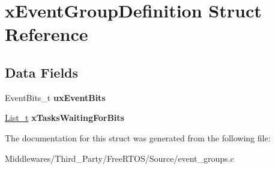 \hypertarget{structx_event_group_definition}{}\section{x\+Event\+Group\+Definition Struct Reference}
\label{structx_event_group_definition}
\subsection*{Data Fields}
\begin{DoxyCompactItemize}
\item 
\mbox{\label{structx_event_group_definition_a518ab52c1060afbc5ca27d6d904be9e1}} 
Event\+Bits\+\_\+t {\bfseries ux\+Event\+Bits}
\item 
\mbox{\label{structx_event_group_definition_a3cad6f30679ed2f331cdcac8e0698525}} 
\mbox{\hyperlink{structx_l_i_s_t}{List\+\_\+t}} {\bfseries x\+Tasks\+Waiting\+For\+Bits}
\end{DoxyCompactItemize}


The documentation for this struct was generated from the following file\+:\begin{DoxyCompactItemize}
\item 
Middlewares/\+Third\+\_\+\+Party/\+Free\+R\+T\+O\+S/\+Source/event\+\_\+groups.\+c\end{DoxyCompactItemize}
